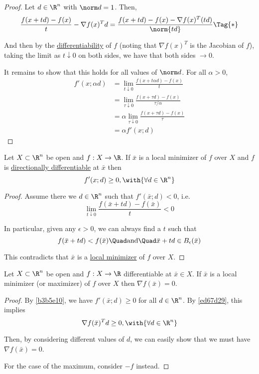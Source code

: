 \begin{proof}
  Let $d\in\R^n$ with $\norm d=1$. Then,
  \begin{equation*}
    \frac{f(x+td)-f(x)}{t}-\nabla f(x)^Td
    =\frac{f(x+td)-f(x)-\nabla f(x)^T(td)}{\norm{td}}\Tag{*}
  \end{equation*}

  And then by the \href{c62315d}{differentiability} of $f$ (noting that $\nabla
  f(x)^T$ is the Jacobian of $f$), taking the limit as $t\downarrow0$ on both
  sides, we have that both sides $\to0$.

  It remains to show that this holds for all values of $\norm d$. For all
  $\alpha>0$,
  \begin{align*}
    f'(x;\alpha d)
     &=\lim_{t\downarrow0}\frac{f(x+t\alpha d)-f(x)}t             \\
     &=\lim_{\tau\downarrow0}\frac{f(x+\tau d)-f(x)}{\tau/\alpha} \\
     &=\alpha\lim_{\tau\downarrow0}\frac{f(x+\tau d)-f(x)}\tau    \\
     &=\alpha f'(x;d)
  \end{align*}
\end{proof}

\label{b3b5e10}

Let $X\subset\R^n$ be open and $f:X\to\R$. If $\bar x$ is a local minimizer of
$f$ over $X$ and $f$ is \href{b7d1188}{directionally differentiable} at $\bar
x$ then
$$
  f'(x;d)\geq0,\with{\forall d\in\R^n}
$$

\begin{proof}
  Assume there we $d\in\R^n$ such that $f'(\bar x;d)<0$, i.e.
  $$
    \lim_{t\downarrow0}\frac{f(\bar x+td)-f(\bar x)}t<0
  $$

  In particular, given any $\epsilon>0$, we can always find a $t$ such that
  $$
    f(\bar x+td)<f(\bar x)\Quad\text{and}\Quad \bar x+td\in B_\epsilon(\bar x)
  $$

  This contradicts that $\bar x$ is a \href{bc7900e}{local minimizer} of $f$
  over $X$.
\end{proof}

\label{dc165c9}

Let $X\subset\R^n$ be open and $f:X\to\R$ differentiable at $\bar x\in X$. If
$\bar x$ is a local minimizer (or maximizer) of $f$ over $X$ then $\nabla
f(\bar x)=0$.

\begin{proof}
  By \autoref{b3b5e10}, we have $f'(\bar x;d)\geq0$ for all
  $d\in\R^n$. By \autoref{ed67d29}, this implies
  $$
    \nabla f(\bar x)^Td\geq0,\with{\forall d\in\R^n}
  $$

  Then, by considering different values of $d$, we can easily show that we must
  have $\nabla f(\bar x)=0$.

  For the case of the maximum, consider $-f$ instead.
\end{proof}

